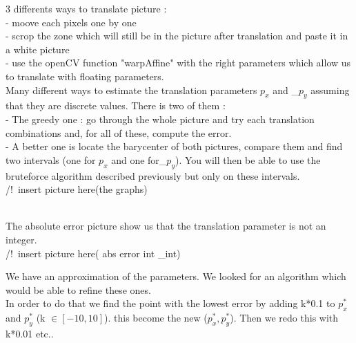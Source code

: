 3 differents ways to translate picture :\\

	- moove each pixels one by one\\
	- scrop the zone which will still be in the picture after translation and paste it in a white picture\\
	- use the openCV function "warpAffine" with the right parameters which allow us to translate with floating parameters.\\
	
	

Many different ways to estimate the translation parameters $p_x$ and _$p_y$ assuming that they are discrete values. There is two of them :\\

	- The greedy one : go through the whole picture and try each translation combinations and, for all of these, compute the error.\\
	
	

	- A better one is locate the barycenter of both pictures, compare them and find two intervals (one for $p_x$ and one for_$p_y$). You will then be able to use the bruteforce algorithm described previously but only on these intervals.\\
	
	
/!\ insert picture here(the graphs)



\\

The absolute error picture show us that the translation parameter is not an integer.\\

/!\ insert picture here( abs error int _int)

We have an approximation of the parameters. We looked for an algorithm which would be able to refine these ones.\\
In order to do that we find the point with the lowest error by adding k*0.1 to  $p_x^{*}$ and $p_y^{*}$ (k $\in [-10,10]$). this become the new ($p_x^{*},p_y^{*}$). Then we redo this with k*0.01 etc..
